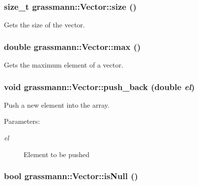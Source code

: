 \hypertarget{classgrassmann_1_1Vector_9ca025b6499bf75f21295c3fa49d03b4}{
\subsubsection[size]{\setlength{\rightskip}{0pt plus 5cm}size\_\-t grassmann::Vector::size ()}}
\label{classgrassmann_1_1Vector_9ca025b6499bf75f21295c3fa49d03b4}


Gets the size of the vector. 

\hypertarget{classgrassmann_1_1Vector_5b66d2b06688e0e4abfb7a2d62c73f35}{
\subsubsection[max]{\setlength{\rightskip}{0pt plus 5cm}double grassmann::Vector::max ()}}
\label{classgrassmann_1_1Vector_5b66d2b06688e0e4abfb7a2d62c73f35}


Gets the maximum element of a vector. 

\hypertarget{classgrassmann_1_1Vector_b291b7fed796d989e4448c240857cf63}{
\subsubsection[push\_\-back]{\setlength{\rightskip}{0pt plus 5cm}void grassmann::Vector::push\_\-back (double {\em el})}}
\label{classgrassmann_1_1Vector_b291b7fed796d989e4448c240857cf63}


Push a new element into the array. 

\begin{Desc}
\item[Parameters:]
\begin{description}
\item[{\em el}]Element to be pushed \end{description}
\end{Desc}
\hypertarget{classgrassmann_1_1Vector_233859ed21cd1cbba69d240de0cf2ba3}{
\subsubsection[isNull]{\setlength{\rightskip}{0pt plus 5cm}bool grassmann::Vector::isNull ()}}
\label{classgrassmann_1_1Vector_233859ed21cd1cbba69d240de0cf2ba3}


